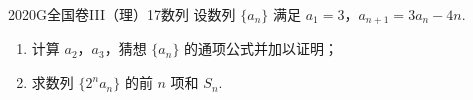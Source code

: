 
\begin{problem}{2020}{G}{全国卷III（理）}{17}{数列}
设数列 $ \{a_n\} $ 满足 $ a_1 = 3 $，$ a_{n+1} = 3a_n - 4n $.
\begin{enumerate}
\item 计算 $ a_2 $，$ a_3 $，猜想 $ \{a_n\} $ 的通项公式并加以证明；
\item 求数列 $ \{2^n a_n\} $ 的前 $ n $ 项和 $ S_n $.
\end{enumerate}
\end{problem}

\begin{answer}

\end{answer}

\begin{solutions}

\end{solutions}